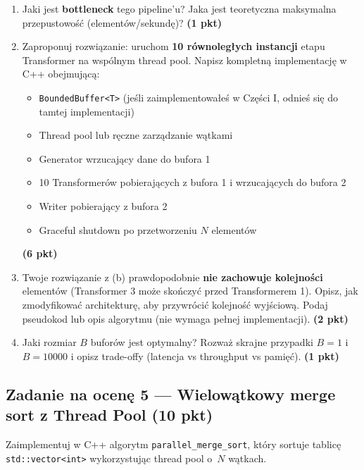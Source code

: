 \documentclass[11pt,a4paper]{article}
\newcommand{\pkt}[1]{\hfill\textbf{(#1 pkt)}}
\begin{document}
\begin{enumerate}[label=(\alph*)]
\item Jaki jest \textbf{bottleneck} tego pipeline'u? Jaka jest teoretyczna maksymalna przepustowość (elementów/sekundę)? \pkt{1}

\item Zaproponuj rozwiązanie: uruchom \textbf{10 równoległych instancji} etapu Transformer na wspólnym thread pool. Napisz kompletną implementację w C++ obejmującą:
\begin{itemize}
	\item \texttt{BoundedBuffer<T>} (jeśli zaimplementowałeś w Części I, odnieś się do tamtej implementacji)
	\item Thread pool lub ręczne zarządzanie wątkami
	\item Generator wrzucający dane do bufora 1
	\item 10 Transformerów pobierających z bufora 1 i wrzucających do bufora 2
	\item Writer pobierający z bufora 2
	\item Graceful shutdown po przetworzeniu $N$ elementów
\end{itemize}
\pkt{6}

\item Twoje rozwiązanie z (b) prawdopodobnie \textbf{nie zachowuje kolejności} elementów (Transformer 3 może skończyć przed Transformerem 1). Opisz, jak zmodyfikować architekturę, aby przywrócić kolejność wyjściową. Podaj pseudokod lub opis algorytmu (nie wymaga pełnej implementacji). \pkt{2}

\item Jaki rozmiar $B$ buforów jest optymalny? Rozważ skrajne przypadki $B=1$ i $B=10000$ i opisz trade-offy (latencja vs throughput vs pamięć). \pkt{1}
\end{enumerate}

\vspace{5mm}

\subsection*{Zadanie na ocenę 5 --- Wielowątkowy merge sort z Thread Pool \pkt{10}}

Zaimplementuj w C++ algorytm \texttt{parallel\_merge\_sort}, który sortuje tablicę \texttt{std::vector<int>} wykorzystując thread pool o~$N$ wątkach.
\end{document}
